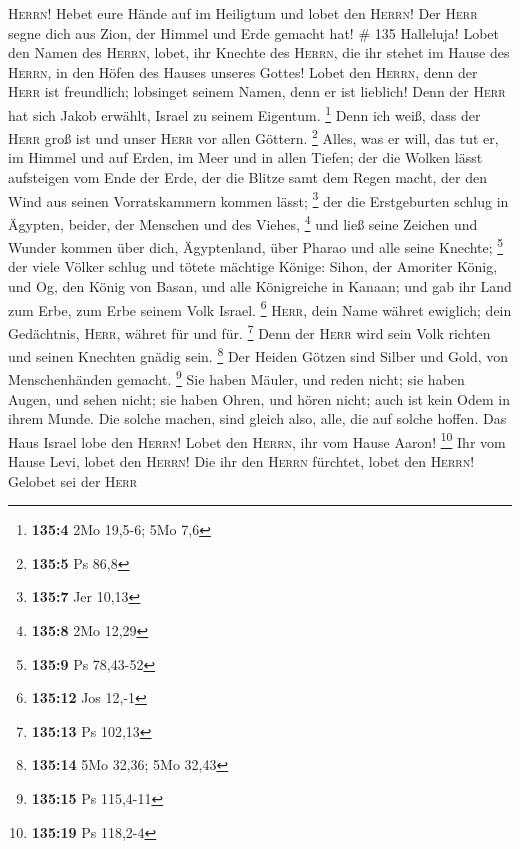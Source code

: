 \textsc{Herrn}!  Hebet eure Hände auf im Heiligtum und
lobet den \textsc{Herrn}!  Der \textsc{Herr} segne dich
aus Zion, der Himmel und Erde gemacht hat! \# 135 
Halleluja! Lobet den Namen des \textsc{Herrn}, lobet, ihr Knechte des
\textsc{Herrn},  die ihr stehet im Hause des
\textsc{Herrn}, in den Höfen des Hauses unseres Gottes! 
Lobet den \textsc{Herrn}, denn der \textsc{Herr} ist freundlich;
lobsinget seinem Namen, denn er ist lieblich!  Denn der
\textsc{Herr} hat sich Jakob erwählt, Israel zu seinem Eigentum.
\footnote{\textbf{135:4} 2Mo 19,5-6; 5Mo 7,6}  Denn ich
weiß, dass der \textsc{Herr} groß ist und unser \textsc{Herr} vor allen
Göttern. \footnote{\textbf{135:5} Ps 86,8}  Alles, was er
will, das tut er, im Himmel und auf Erden, im Meer und in allen Tiefen;
 der die Wolken lässt aufsteigen vom Ende der Erde, der
die Blitze samt dem Regen macht, der den Wind aus seinen Vorratskammern
kommen lässt; \footnote{\textbf{135:7} Jer 10,13}  der die
Erstgeburten schlug in Ägypten, beider, der Menschen und des Viehes,
\footnote{\textbf{135:8} 2Mo 12,29}  und ließ seine
Zeichen und Wunder kommen über dich, Ägyptenland, über Pharao und alle
seine Knechte; \footnote{\textbf{135:9} Ps 78,43-52}  der
viele Völker schlug und tötete mächtige Könige:  Sihon,
der Amoriter König, und Og, den König von Basan, und alle Königreiche in
Kanaan;  und gab ihr Land zum Erbe, zum Erbe seinem Volk
Israel. \footnote{\textbf{135:12} Jos 12,-1} 
\textsc{Herr}, dein Name währet ewiglich; dein Gedächtnis,
\textsc{Herr}, währet für und für. \footnote{\textbf{135:13} Ps 102,13}
 Denn der \textsc{Herr} wird sein Volk richten und seinen
Knechten gnädig sein. \footnote{\textbf{135:14} 5Mo 32,36; 5Mo 32,43}
 Der Heiden Götzen sind Silber und Gold, von
Menschenhänden gemacht. \footnote{\textbf{135:15} Ps 115,4-11}
 Sie haben Mäuler, und reden nicht; sie haben Augen, und
sehen nicht;  sie haben Ohren, und hören nicht; auch ist
kein Odem in ihrem Munde.  Die solche machen, sind gleich
also, alle, die auf solche hoffen.  Das Haus Israel lobe
den \textsc{Herrn}! Lobet den \textsc{Herrn}, ihr vom Hause Aaron!
\footnote{\textbf{135:19} Ps 118,2-4}  Ihr vom Hause
Levi, lobet den \textsc{Herrn}! Die ihr den \textsc{Herrn} fürchtet,
lobet den \textsc{Herrn}!  Gelobet sei der \textsc{Herr}

